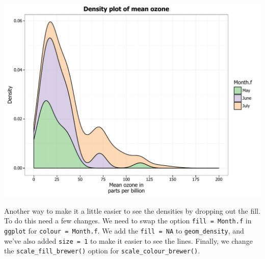 \begin{center}\includegraphics[width=0.55\linewidth]{figures/density_17-1} \end{center}

Another way to make it a little easier to see the densities by dropping
out the fill. To do this need a few changes. We need to swap the option
\texttt{fill\ =\ Month.f} in \texttt{ggplot} for
\texttt{colour\ =\ Month.f}. We add the \texttt{fill\ =\ NA} to
\texttt{geom\_density}, and we've also added \texttt{size\ =\ 1} to make
it easier to see the lines. Finally, we change the
\texttt{scale\_fill\_brewer()} option for
\texttt{scale\_colour\_brewer()}.

\begin{Shaded}
\begin{Highlighting}[]
\StringTok{ }\NormalTok{(}  \StringTok{ }
\StringTok{      }\NormalTok{(}\NormalTok{, } \NormalTok{, } \NormalTok{) +}
\StringTok{      }\NormalTok{(} \NormalTok{,}
\StringTok{        } \NormalTok{(}\NormalTok{, }\NormalTok{, }\NormalTok{),}
\StringTok{        }\NormalTok{(}\NormalTok{, }\NormalTok{)) +}
\StringTok{      }\NormalTok{(} \NormalTok{) +}
\StringTok{      }\NormalTok{(}\NormalTok{) +}
\StringTok{      }\NormalTok{(}\NormalTok{) +}
\StringTok{      }\NormalTok{() +}
\StringTok{      }\NormalTok{(} \NormalTok{(} \NormalTok{, } \NormalTok{, } \NormalTok{), }
\StringTok{        } \NormalTok{(} \NormalTok{, } \NormalTok{))}
\end{Highlighting}
\end{Shaded}

